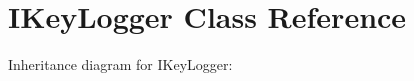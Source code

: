 \section{I\+Key\+Logger Class Reference}
\label{class_i_key_logger}


Inheritance diagram for I\+Key\+Logger\+:
